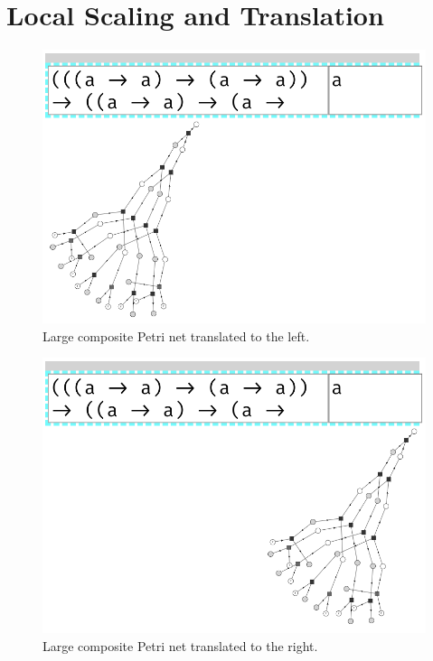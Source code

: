 \documentclass[11pt,openright,hidelinks,a4paper]{article}
\begin{document}
\section{Local Scaling and Translation}\label{app:zoomtrans}

\begin{figure}[H]
\begin{center}
\includegraphics[scale=0.45]{lefttranslate}
\end{center}
\caption{Large composite Petri net translated to the left.}
\label{fig:lefttranslate}
\end{figure}

\begin{figure}[H]
\begin{center}
\includegraphics[scale=0.45]{righttranslate}
\end{center}
\caption{Large composite Petri net translated to the right.}
\label{fig:righttranslate}
\end{figure}
\end{document}
